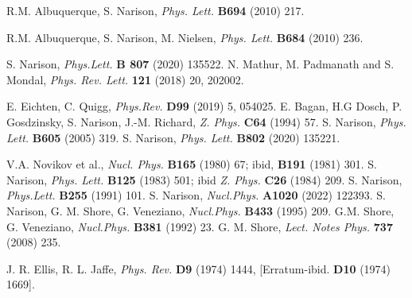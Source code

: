     R.M. Albuquerque, S. Narison, {\it Phys. Lett.} {\bf B694} (2010) 217.

R.M. Albuquerque, S. Narison, M. Nielsen, {\it Phys. Lett.} {\bf B684} (2010) 236.









 
 
 S. Narison, {\it  Phys.Lett.} {\bf B 807} (2020) 135522.
  N. Mathur, M. Padmanath and S. Mondal, {\it Phys. Rev. Lett.} {\bf121} (2018) 20, 202002.

 E. Eichten, C. Quigg, {\it Phys.Rev.} {\bf D99} (2019) 5, 054025. 
  E. Bagan, H.G Dosch, P. Gosdzinsky, S. Narison, J.-M. Richard, {\it Z. Phys.} {\bf C64} (1994) 57.
   S. Narison,  {\it Phys. Lett.} {\bf B605}  (2005) 319.
   S. Narison, {\it Phys. Lett.} {\bf B802} (2020) 135221.

V.A. Novikov et al., {\it Nucl. Phys.} {\bf B165} (1980) 67; ibid, 
 {\bf B191} (1981) 301.
 S. Narison, {\it Phys. Lett.} {\bf B125} (1983) 501; ibid {\it Z. Phys.} {\bf  C26} (1984) 209.
  S. Narison, {\it Phys.Lett.} {\bf B255} (1991) 101.
  S. Narison, {\it Nucl.Phys.} {\bf A1020} (2022) 122393.
  S. Narison, G. M. Shore, G. Veneziano, {\it Nucl.Phys.} {\bf B433} (1995) 209.
    G.M. Shore, G. Veneziano, {\it Nucl.Phys.} {\bf B381} (1992) 23.
   G. M. Shore,   {\it Lect. Notes Phys.} {\bf 737} (2008) 235. %

 J. R. Ellis, R. L. Jaffe, {\it Phys. Rev.} {\bf D9} (1974)  1444, [Erratum-ibid. {\bf D10} (1974) 1669].

